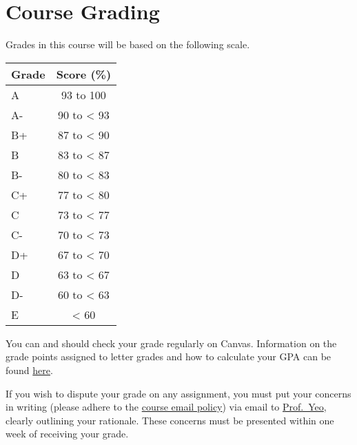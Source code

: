 \documentclass[
  letterpaper,
]{article}
\begin{document}
\hypertarget{course-grading}{%
\section{Course Grading}\label{course-grading}}

Grades in this course will be based on the following scale.

\begin{longtable}[]{@{}lc@{}}
\toprule\noalign{}
Grade & Score (\%) \\
\midrule\noalign{}
\endhead
\bottomrule\noalign{}
\endlastfoot
A & 93 to 100 \\
A- & 90 to \textless{} 93 \\
B+ & 87 to \textless{} 90 \\
B & 83 to \textless{} 87 \\
B- & 80 to \textless{} 83 \\
C+ & 77 to \textless{} 80 \\
C & 73 to \textless{} 77 \\
C- & 70 to \textless{} 73 \\
D+ & 67 to \textless{} 70 \\
D & 63 to \textless{} 67 \\
D- & 60 to \textless{} 63 \\
E & \textless{} 60 \\
\end{longtable}

You can and should check your grade regularly on Canvas. Information on
the grade points assigned to letter grades and how to calculate your GPA
can be found
\href{https://advising.utah.edu/academic-standards/gpa-calculator-new.php}{here}.

\begin{tcolorbox}[enhanced jigsaw, bottomrule=.15mm, leftrule=.75mm, toptitle=1mm, titlerule=0mm, breakable, toprule=.15mm, opacityback=0, colbacktitle=quarto-callout-important-color!10!white, colback=white, title=\textcolor{quarto-callout-important-color}{\faExclamation}\hspace{0.5em}{Important}, bottomtitle=1mm, arc=.35mm, rightrule=.15mm, coltitle=black, colframe=quarto-callout-important-color-frame, left=2mm, opacitybacktitle=0.6]

If you wish to dispute your grade on any assignment, you must put your
concerns in writing (please adhere to the
\protect\hyperlink{sec-policies}{course email policy}) via email to
\href{sara.yeo@utah.edu}{Prof.~Yeo}, clearly outlining your rationale.
These concerns must be presented within one week of receiving your
grade.

\end{tcolorbox}
\end{document}
